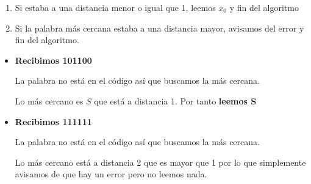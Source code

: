 \begin{problem}[1]
\begin{enumerate}
\item Si estaba a una distancia menor o igual que 1, leemos $x_0$ y fin del algoritmo

\item Si la palabra más cercana estaba a una distancia mayor, avisamos del error y fin del algoritmo.
\end{enumerate}

\spart

\begin{itemize}
\item \textbf{Recibimos 101100}

La palabra no está en el código así que buscamos la más cercana.

Lo más cercano es $S$ que está a distancia 1. Por tanto \textbf{leemos S}

\item \textbf{Recibimos 111111}

La palabra no está en el código así que buscamos la más cercana.

Lo más cercano está a distancia 2 que es mayor que 1 por lo que simplemente avisamos de que hay un error pero no leemos nada.

\end{itemize}
\end{problem}

